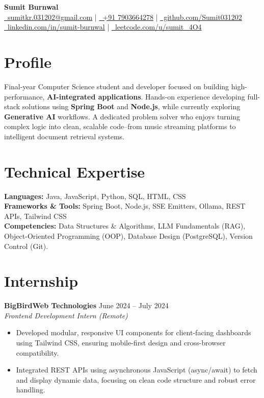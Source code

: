 \documentclass[a4paper,10.9pt]{article}
\begin{document}
\begin{center}
    {\Huge\color{darkblue}\textbf{Sumit Burnwal}} \\ [4pt]
    \small
    \href{mailto:sumitkr.031202@gmail.com}{\faEnvelope\ sumitkr.031202@gmail.com} \quad | \quad 
    \href{tel:+917903664278}{\faMobile\ +91 7903664278} \quad | \quad
    \href{https://github.com/Sumit031202}{\faGithub\ github.com/Sumit031202} \\ [2pt]
    \href{https://www.linkedin.com/in/sumit-burnwal/}{\faLinkedin\ linkedin.com/in/sumit-burnwal} \quad | \quad 
    \href{https://leetcode.com/u/sumit_4O4/}{\faCode\ leetcode.com/u/sumit\_4O4}
\end{center}

\vspace{2pt}

\section{Profile} 
Final-year Computer Science student and developer focused on building high-performance, \textbf{AI-integrated applications}. Hands-on experience developing full-stack solutions using \textbf{Spring Boot} and \textbf{Node.js}, while currently exploring \textbf{Generative AI} workflows. A dedicated problem solver who enjoys turning complex logic into clean, scalable code--from music streaming platforms to intelligent document retrieval systems.

\section{Technical Expertise}
\textbf{Languages:} Java, JavaScript, Python, SQL, HTML, CSS \\ [1pt]
\textbf{Frameworks \& Tools:} Spring Boot, Node.js, SSE Emitters, Ollama, REST APIs, Tailwind CSS\\ [1pt]
\textbf{Competencies:} Data Structures \& Algorithms, LLM Fundamentals (RAG), Object-Oriented Programming (OOP), Database Design (PostgreSQL), Version Control (Git).

\section{Internship}
\textbf{BigBirdWeb Technologies} \hfill June 2024 – July 2024 \\
\textit{Frontend Development Intern (Remote)}
\begin{itemize}[leftmargin=1.5em, itemsep=2pt, parsep=0pt, topsep=2pt]
    \item Developed modular, responsive UI components for client-facing dashboards using Tailwind CSS, ensuring mobile-first design and cross-browser compatibility.
    \item Integrated REST APIs using asynchronous JavaScript (async/await) to fetch and display dynamic data, focusing on clean code structure and robust error handling.
\end{itemize}
\end{document}
